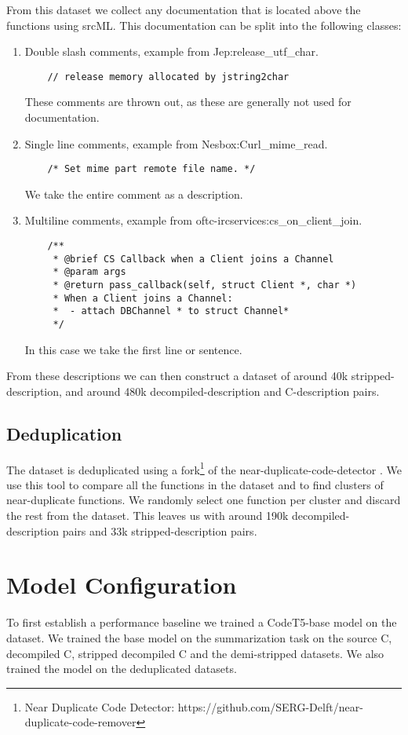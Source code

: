 From this dataset we collect any documentation that is located above the functions using srcML. This documentation can be split into the following classes: %
\begin{enumerate}
  \item Double slash comments, example from Jep:release\_utf\_char. 
\begin{verbatim}
    // release memory allocated by jstring2char
\end{verbatim}
    These comments are thrown out, as these are generally not used for documentation. %
  \item Single line comments, example from Nesbox:Curl\_mime\_read.
\begin{verbatim}
    /* Set mime part remote file name. */
\end{verbatim}
   We take the entire comment as a description.
  \item Multiline comments, example from oftc-ircservices:cs\_on\_client\_join.
\begin{verbatim}
    /**
     * @brief CS Callback when a Client joins a Channel
     * @param args 
     * @return pass_callback(self, struct Client *, char *)
     * When a Client joins a Channel:
     *  - attach DBChannel * to struct Channel*
     */
\end{verbatim}
    In this case we take the first line or sentence.
\end{enumerate}

From these descriptions we can then construct a dataset of around 40k stripped-description, and around 480k decompiled-description and C-description pairs. 

\subsection{Deduplication}
The dataset is deduplicated using a fork\footnote{Near Duplicate Code Detector: https://github.com/SERG-Delft/near-duplicate-code-remover} of the near-duplicate-code-detector \cite{allamanis_adverse}. We use this tool to compare all the functions in the dataset and to find clusters of near-duplicate functions. We randomly select one function per cluster and discard the rest from the dataset. This leaves us with around 190k decompiled-description pairs and 33k stripped-description pairs.

\section{Model Configuration}
To first establish a performance baseline we trained a CodeT5-base model on the dataset. We trained the base model on the summarization task on the source C, decompiled C, stripped decompiled C and the demi-stripped datasets. We also trained the model on the deduplicated datasets.

